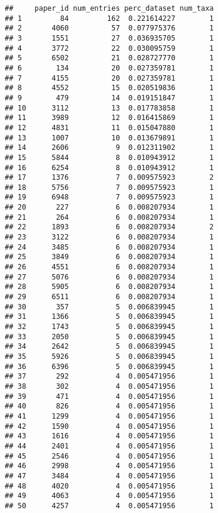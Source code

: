 \documentclass[
]{article}
\begin{document}
\begin{verbatim}
##     paper_id num_entries perc_dataset num_taxa
## 1         84         162  0.221614227        1
## 2       4060          57  0.077975376        1
## 3       1551          27  0.036935705        1
## 4       3772          22  0.030095759        1
## 5       6502          21  0.028727770        1
## 6        134          20  0.027359781        1
## 7       4155          20  0.027359781        1
## 8       4552          15  0.020519836        1
## 9        479          14  0.019151847        1
## 10      3112          13  0.017783858        1
## 11      3989          12  0.016415869        1
## 12      4831          11  0.015047880        1
## 13      1007          10  0.013679891        1
## 14      2606           9  0.012311902        1
## 15      5844           8  0.010943912        1
## 16      6254           8  0.010943912        1
## 17      1376           7  0.009575923        2
## 18      5756           7  0.009575923        1
## 19      6948           7  0.009575923        1
## 20       227           6  0.008207934        1
## 21       264           6  0.008207934        1
## 22      1893           6  0.008207934        2
## 23      3122           6  0.008207934        1
## 24      3485           6  0.008207934        1
## 25      3849           6  0.008207934        1
## 26      4551           6  0.008207934        1
## 27      5076           6  0.008207934        1
## 28      5905           6  0.008207934        1
## 29      6511           6  0.008207934        1
## 30       357           5  0.006839945        1
## 31      1366           5  0.006839945        1
## 32      1743           5  0.006839945        1
## 33      2050           5  0.006839945        1
## 34      2642           5  0.006839945        1
## 35      5926           5  0.006839945        1
## 36      6396           5  0.006839945        1
## 37       292           4  0.005471956        1
## 38       302           4  0.005471956        1
## 39       471           4  0.005471956        1
## 40       826           4  0.005471956        1
## 41      1299           4  0.005471956        1
## 42      1590           4  0.005471956        1
## 43      1616           4  0.005471956        1
## 44      2401           4  0.005471956        1
## 45      2546           4  0.005471956        1
## 46      2998           4  0.005471956        1
## 47      3484           4  0.005471956        1
## 48      4020           4  0.005471956        1
## 49      4063           4  0.005471956        1
## 50      4257           4  0.005471956        1

\end{verbatim}
\end{document}
